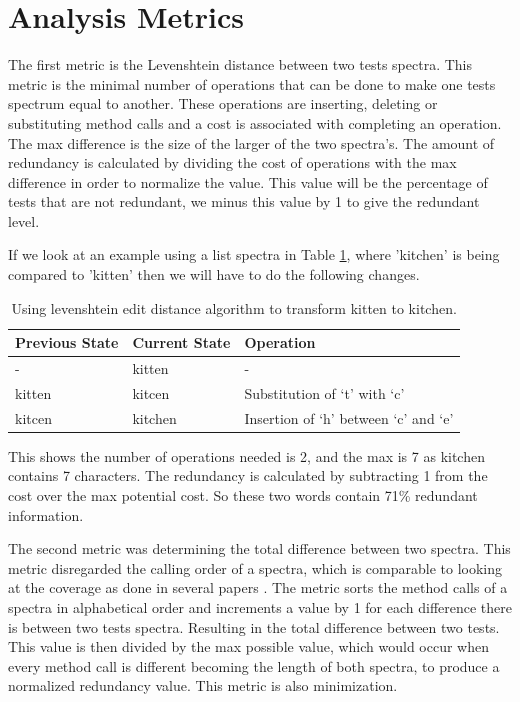 \section{Analysis Metrics}
\label{S:metrics}

The first metric is the Levenshtein distance between two tests spectra. This metric is the minimal number of operations that can be done to make one tests spectrum equal to another. These operations are inserting, deleting or substituting method calls and a cost is associated with completing an operation. The max difference is the size of the larger of the two spectra's. The amount of redundancy is calculated by dividing the cost of operations with the max difference in order to normalize the value. This value will be the percentage of tests that are not redundant, we minus this value by 1 to give the redundant level.

If we look at an example using a list spectra in Table \ref{levenTable}, where 'kitchen' is being compared to 'kitten' then we will have to do the following changes.

\begin{table}[]
\centering
\caption{Using levenshtein edit distance algorithm to transform kitten to kitchen.}
\label{levenTable}
\begin{tabular}{|l|l|l|}
\hline
{\bf Previous State} & {\bf Current State} & {\bf Operation}                      \\ \hline
-                    & kitten              & -                                    \\ \hline
kitten               & kitcen              & Substitution of `t' with `c'         \\ \hline
kitcen               & kitchen             & Insertion of `h' between `c' and `e' \\ \hline
\end{tabular}
\end{table}

This shows the number of operations needed is 2, and the max is 7 as kitchen contains 7 characters. The redundancy is calculated by subtracting 1 from the cost over the max potential cost. So these two words contain 71\% redundant information. 

The second metric was determining the total difference between two spectra. This metric disregarded the calling order of a spectra, which is comparable to looking at the coverage as done in several papers \cite{fraser2007redundancy,koochakzadeh2009test,zhang2011empirical,jeffrey2005test}. The metric sorts the method calls of a spectra in alphabetical order and increments a value by 1 for each difference there is between two tests spectra. Resulting in the total difference between two tests. This value is then divided by the max possible value, which would occur when every method call is different becoming the length of both spectra, to produce a normalized redundancy value. This metric is also minimization.

